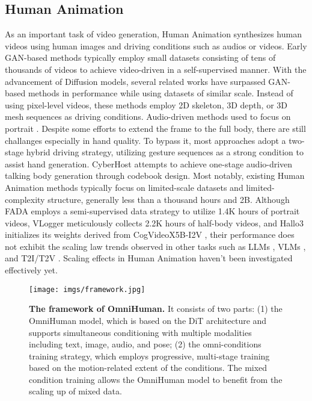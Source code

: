   \subsection{Human Animation}
  As an important task of video generation, Human Animation synthesizes human videos using human images and driving conditions such as audios or videos. Early  GAN-based methods \cite{siarohin2019fomm, zhao2022tps, siarohin2021mraa, jiang2024mobileportrait, wang2021facev2v} typically employ small datasets \cite{nagrani2017voxceleb, siarohin2019fomm, xie2022vfhq, zhu2022celebv} consisting of tens of thousands of videos to achieve video-driven in a self-supervised manner. With the advancement of Diffusion models, several related works \cite{Disco, aa, champ, shao2024human4dit, zhang2024mimicmotion} have surpassed GAN-based methods in performance while using datasets of similar scale. Instead of using pixel-level videos, these methods employ 2D skeleton, 3D depth, or 3D mesh sequences as driving conditions.
  Audio-driven methods used to focus on portrait \cite{adnerf,GeneFace,zhang2023sadtalker, EMO, jiang2024loopy, hallo3, fada}. Despite some efforts \cite{VLogger, lin2024cyberhost, EchomimicV2, EMO2, diffted} to extend the frame to the full body, there are still challanges especially in hand quality. To bypass it, most approaches \cite{VLogger,  EchomimicV2, EMO2, diffted} adopt a two-stage hybrid driving strategy, utilizing gesture sequences as a strong condition to assist hand generation. CyberHost \cite{lin2024cyberhost} attempts to achieve one-stage audio-driven talking body generation through codebook design.
  Most notably, existing Human Animation methods typically focus on limited-scale datasets and limited-complexity structure, generally less than a thousand hours and 2B. Although FADA \cite{fada} employs a semi-supervised data strategy to utilize 1.4K hours of portrait videos, VLogger \cite{VLogger} meticulously collects 2.2K hours of half-body videos, and Hallo3 \cite{hallo3} initializes its weights derived from CogVideoX5B-I2V \cite{cogvideox}, their performance  does not exhibit the scaling law trends observed in other tasks such as LLMs \cite{ouyang2022training, touvron2023llama}, VLMs \cite{liu2024improved,bai2023qwen}, and T2I/T2V \cite{esser2024scaling, flux2023, kondratyuk2023videopoet}. Scaling effects in Human Animation  haven't been investigated effectively yet.

  

\begin{figure*}[t]
    \centering
    \texttt{[image: imgs/framework.jpg]}
    \caption{\small \textbf{The framework of OmniHuman.} It consists of two parts: (1) the OmniHuman model, which is based on the DiT architecture and supports simultaneous conditioning with multiple modalities including text, image, audio, and pose; (2) the omni-conditions training strategy, which employs progressive, multi-stage training based on the motion-related extent of the conditions. The mixed condition training allows the OmniHuman model to benefit from the scaling up of mixed data.}
    \label{fig:framework}
\end{figure*}